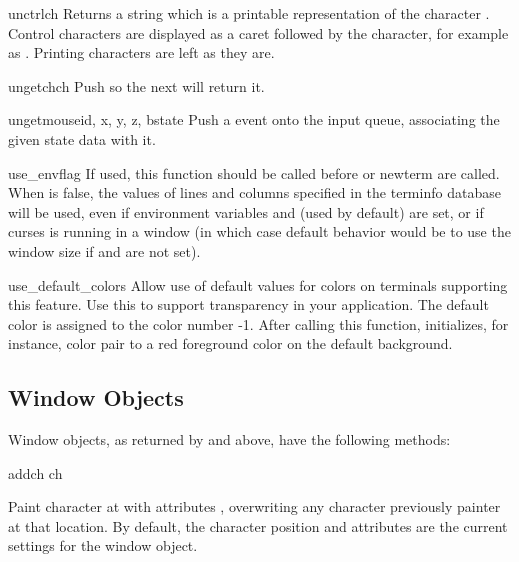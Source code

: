 \begin{funcdesc}{unctrl}{ch}
Returns a string which is a printable representation of the character
.  Control characters are displayed as a caret followed by the
character, for example as . Printing
characters are left as they are.
\end{funcdesc}

\begin{funcdesc}{ungetch}{ch}
Push  so the next  will return it.
\end{funcdesc}

\begin{funcdesc}{ungetmouse}{id, x, y, z, bstate}
Push a  event onto the input queue, associating
the given state data with it.
\end{funcdesc}

\begin{funcdesc}{use_env}{flag}
If used, this function should be called before  or
newterm are called.  When  is false, the values of
lines and columns specified in the terminfo database will be
used, even if environment variables  and
 (used by default) are set, or if curses is running in
a window (in which case default behavior would be to use the window
size if  and  are not set).
\end{funcdesc}

\begin{funcdesc}{use_default_colors}{}
Allow use of default values for colors on terminals supporting this
feature. Use this to support transparency in your
application.  The default color is assigned to the color number -1.
After calling this function, 
 initializes, for instance,
color pair  to a red foreground color on the default background.
\end{funcdesc}

\subsection{Window Objects \label{curses-window-objects}}

Window objects, as returned by  and
 above, have the
following methods:

\begin{methoddesc}[window]{addch}{ ch}

Paint character  at  with attributes
, overwriting any character previously painter at that
location.  By default, the character position and attributes are the
current settings for the window object.
\end{methoddesc}

